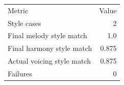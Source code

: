 \begin{tabular}{lr}
Metric & Value \\
Style cases & 2 \\
Final melody style match & 1.0 \\
Final harmony style match & 0.875 \\
Actual voicing style match & 0.875 \\
Failures & 0 \\
\end{tabular}
